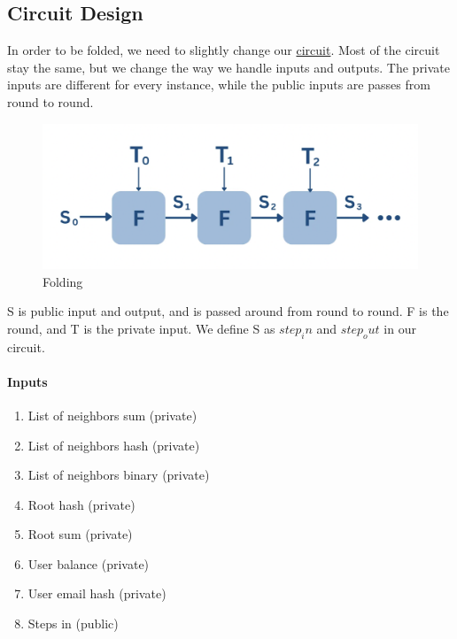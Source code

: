 \subsection{Circuit Design} 
In order to be folded, we need to slightly change our \hyperref[subsec:pi]{circuit}. Most of the circuit stay the same,
but we change the way we handle inputs and outputs. The private inputs are different for every instance, while the public inputs
are passes from round to round.
\begin{figure}[H]
    \centering
    \includegraphics[width=130mm]{FoldingCircuit.png}
    \caption{Folding \cite{VRS23}}
    \label{overflow}
    \end{figure}
S is public input and output, and is passed around from round to round. F is the round, and T is the private input.
We define S as $step_in$ and $step_out$ in our circuit.

\paragraph{Inputs}
\begin{enumerate}

    \item List of neighbors sum (private)
    
    \item List of neighbors hash (private)

    \item List of neighbors binary (private)

    \item Root hash (private)

    \item Root sum (private)

    \item User balance (private)

    \item User email hash (private)

    \item Steps in (public)
    
    \end{enumerate}

